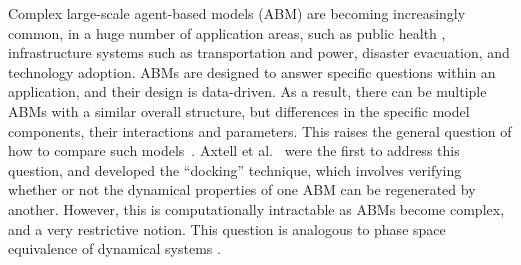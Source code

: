 Complex large-scale agent-based models (ABM) are becoming increasingly common, in a huge number of application areas,
such as public health \cite{epi}, infrastructure systems such as transportation and power, disaster evacuation, and
technology adoption.
ABMs are designed to answer specific questions within an application, and their design is data-driven.
As a result, there can be multiple ABMs with a similar overall structure, but differences in the
specific model components, their interactions and parameters.
This raises the general question of how to compare such models~\cite{axtell96aligning,burton99validation}.
Axtell et al.~\cite{axtell96aligning} were the first to address this question, and developed the ``docking'' technique,
which involves verifying whether or not the dynamical properties of one ABM can be regenerated by another.
However, this is computationally intractable as ABMs become complex, and a very restrictive notion.
This question is analogous to phase space equivalence of dynamical systems \cite{ref}.

